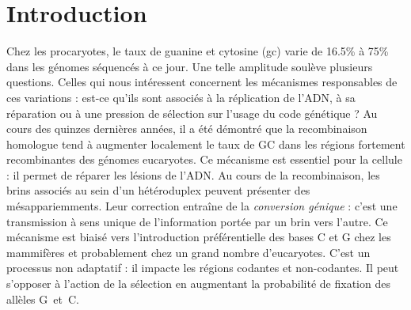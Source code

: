 
\newpage



\section*{Introduction}
\label{sec:introduction}


Chez les procaryotes, le taux de guanine et cytosine (\ac{gc}) varie de 16.5\% à
75\% dans les génomes séquencés à ce jour. Une telle amplitude soulève plusieurs
questions. Celles qui nous intéressent concernent les mécanismes responsables de
ces variations : est-ce qu'ils sont associés à la réplication de l'ADN, à sa
réparation ou à une pression de sélection sur l'usage du code génétique ? Au
cours des quinzes dernières années, il a été démontré que la recombinaison
homologue tend à augmenter localement le taux de GC dans les régions fortement
recombinantes des génomes eucaryotes\cite{duret_biased_2009,
  lesecque_gc-biased_2013, williams_non-crossover_2015}. Ce mécanisme est
essentiel pour la cellule : il permet de réparer les lésions de l'ADN. Au cours
de la recombinaison, les brins associés au sein d'un hétéroduplex peuvent
présenter des mésappariemments. Leur correction entraîne de la \emph{conversion
  génique}\cite{chen_gene_2007} : c'est une transmission à sens unique de
l'information portée par un brin vers l'autre. Ce mécanisme est biaisé vers
l'introduction préférentielle des bases C et G chez les mammifères et
probablement chez un grand nombre d'eucaryotes\cite{pessia_evidence_2012}. C'est
un processus non adaptatif : il impacte les régions codantes et non-codantes. Il
peut s'opposer à l'action de la sélection en augmentant la probabilité de
fixation des allèles G~et~C\cite{ratnakumar_detecting_2010,
  galtier_gc-biased_2009}.

